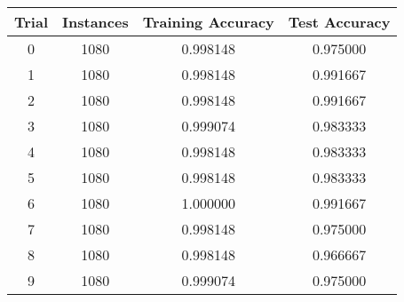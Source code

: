 {\footnotesize
\begin{tabular}{ c | c | c | c }
Trial & Instances & Training Accuracy & Test Accuracy \\
\hline
0 & 1080 & 0.998148 & 0.975000 \\
1 & 1080 & 0.998148 & 0.991667 \\
2 & 1080 & 0.998148 & 0.991667 \\
3 & 1080 & 0.999074 & 0.983333 \\
4 & 1080 & 0.998148 & 0.983333 \\
5 & 1080 & 0.998148 & 0.983333 \\
6 & 1080 & 1.000000 & 0.991667 \\
7 & 1080 & 0.998148 & 0.975000 \\
8 & 1080 & 0.998148 & 0.966667 \\
9 & 1080 & 0.999074 & 0.975000 \\
\end{tabular}
}
